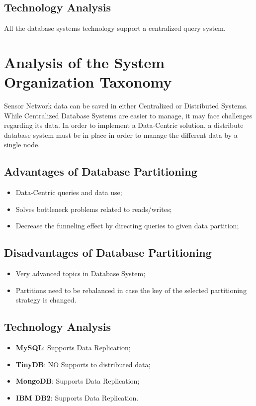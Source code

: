 \subsection{Technology Analysis}

All the database systems technology support a centralized query system.

\section{Analysis of the System Organization Taxonomy}

Sensor Network data can be saved in either Centralized or Distributed Systems.
While Centralized Database Systems are easier to manage, it may
face challenges regarding its data. In order to implement a Data-Centric
solution, a distribute database system must be in place in order to manage
the different data by a single node.

\subsection{Advantages of Database Partitioning}

\begin{itemize}
  \item Data-Centric queries and data use;
  \item Solves bottleneck problems related to reads/writes;
  \item Decrease the funneling effect by directing queries to given data
  partition;
\end{itemize}

\subsection{Disadvantages of Database Partitioning}

\begin{itemize}
  \item Very advanced topics in Database System;
  \item Partitions need to be rebalanced in case the key of the selected 
  partitioning strategy is changed.
\end{itemize}

\subsection{Technology Analysis}

\begin{itemize}
  \item \textbf{MySQL}: Supports Data Replication;
  \item \textbf{TinyDB}: NO Supports to distributed data;
  \item \textbf{MongoDB}: Supports Data Replication;
  \item \textbf{IBM DB2}: Supports Data Replication.
\end{itemize}

